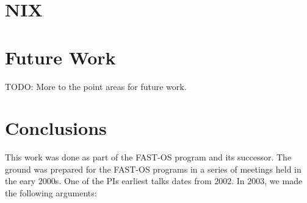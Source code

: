 \documentclass{report}
\begin{document}
\chapter{NIX}

\chapter{Future Work}
TODO: More to the point areas for
future work.
\chapter{Conclusions}

This work was done as part of the FAST-OS program and its successor. 
The ground was prepared for the FAST-OS programs in a series of meetings held in
the eary 2000s. One of the PIs earliest talks dates from 2002. In 2003, we made
the following arguments: 
\end{document}
